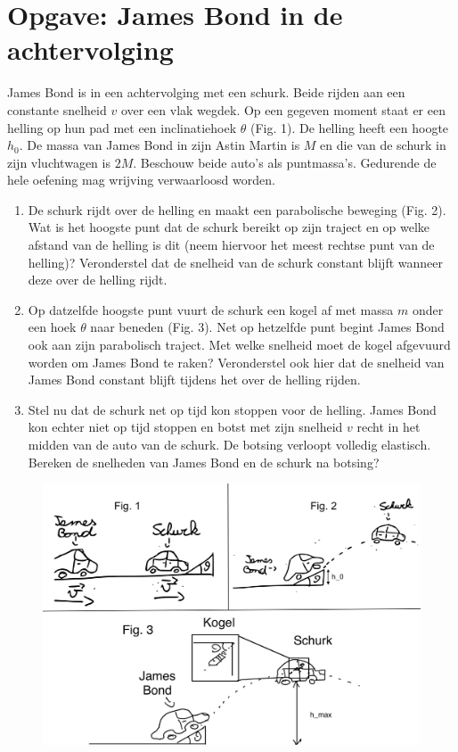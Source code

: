 \documentclass[11pt]{article}
\begin{document}
\newpage

\section{Opgave: James Bond in de achtervolging}
James Bond is in een achtervolging met een schurk. Beide rijden aan een constante snelheid $v$ over een vlak wegdek. Op een gegeven moment staat er een helling op hun pad met een inclinatiehoek $\theta$ (Fig. 1). De helling heeft een hoogte $h_0$. De massa van James Bond in zijn Astin Martin is $M$ en die van de schurk in zijn vluchtwagen is $2M$. Beschouw beide auto's als puntmassa's. Gedurende de hele oefening mag wrijving verwaarloosd worden.\\

\begin{enumerate}
    \item De schurk rijdt over de helling en maakt een parabolische beweging (Fig. 2). Wat is het hoogste punt dat de schurk bereikt op zijn traject en op welke afstand van de helling is dit (neem hiervoor het meest rechtse punt van de helling)? Veronderstel dat de snelheid van de schurk constant blijft wanneer deze over de helling rijdt.
    \item Op datzelfde hoogste punt vuurt de schurk een kogel af met massa $m$ onder een hoek $\theta$ naar beneden (Fig. 3). Net op hetzelfde punt begint James Bond ook aan zijn parabolisch traject. Met welke snelheid moet de kogel afgevuurd worden om James Bond te raken? Veronderstel ook hier dat de snelheid van James Bond constant blijft tijdens het over de helling rijden.
    \item Stel nu dat de schurk net op tijd kon stoppen voor de helling. James Bond kon echter niet op tijd stoppen en botst met zijn snelheid $v$ recht in het midden van de auto van de schurk. De botsing verloopt volledig elastisch. Bereken de snelheden van James Bond en de schurk na botsing?
 
\end{enumerate}

\begin{figure}
    \centering
    \includegraphics[width = \textwidth]{James_Bond.png} 
\end{figure}
\end{document}
